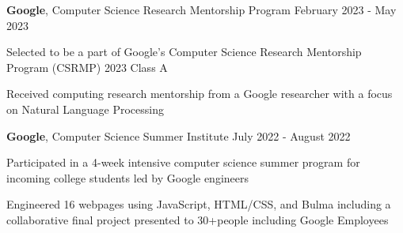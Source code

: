 
\begin{cventries}

  \cventry
    {\textbf{Google}, Computer Science Research Mentorship Program}
    {}
    {}
    {February 2023 - May 2023}
    {
      \begin{cvitems}
        \item{Selected to be a part of Google’s Computer Science Research Mentorship Program (CSRMP) 2023 Class A}
        \item{Received computing research mentorship from a Google researcher with a focus on Natural Language Processing}
      \end{cvitems}
    }

  \cventry
    {\textbf{Google}, Computer Science Summer Institute}
    {}
    {}
    {July 2022 - August 2022}
    {
      \begin{cvitems}
        \item{Participated in a 4-week intensive computer science summer program for incoming college students led by Google engineers}
        \item{Engineered 16 webpages using JavaScript, HTML/CSS, and Bulma including a collaborative final project presented to 30+people including Google Employees}
      \end{cvitems}
    }

\end{cventries}

      